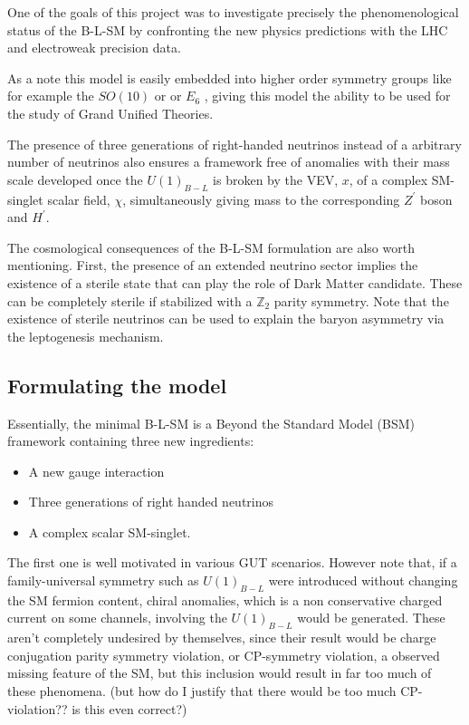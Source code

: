 One of the goals of this project was to investigate precisely the phenomenological status of the B-L-SM by confronting the new physics predictions with the LHC and electroweak precision data.   

As a note this model is easily embedded into higher order symmetry groups like for example the $SO(10)$ or  or $E_6$ , giving this model the ability to be used for the study of Grand Unified Theories.  

The presence of three generations of right-handed neutrinos instead of a arbitrary number of neutrinos also ensures a framework free of anomalies with their mass scale developed once the $U(1)_{B-L}$ is broken by the VEV, $x$, of a complex SM-singlet scalar field, $\chi$, simultaneously giving mass to the corresponding $Z^\prime$ boson and $H^\prime$.
  
The cosmological consequences of the B-L-SM formulation are also worth mentioning.  First, the presence of an extended neutrino sector implies the existence of a sterile state that can play the role of Dark Matter candidate. These can be completely sterile if stabilized with a $\mathbb{Z}_2$ parity symmetry. Note that the existence of sterile neutrinos can be used to explain the baryon asymmetry via the leptogenesis mechanism. 

\subsection{Formulating the model}

Essentially, the minimal B-L-SM is a Beyond the Standard Model (BSM) framework containing three new ingredients: 

\begin{itemize}
  \item A new gauge interaction
  \item Three generations of right handed neutrinos  
  \item A complex scalar SM-singlet.
\end{itemize}

The first one is well motivated in various GUT scenarios. However note that, if a family-universal symmetry such as $U(1)_{B-L}$ were introduced without changing the SM fermion content, chiral anomalies, which is a non conservative charged current on some channels, involving the $U(1)_{B-L}$ would be generated. These aren't completely undesired by themselves, since their result would be charge conjugation parity symmetry violation, or CP-symmetry violation, a observed missing feature of the SM, but this inclusion would result in far too much of these phenomena. {  \color{red}  (but how do I justify that there would be too much CP-violation?? is this even correct?) }

